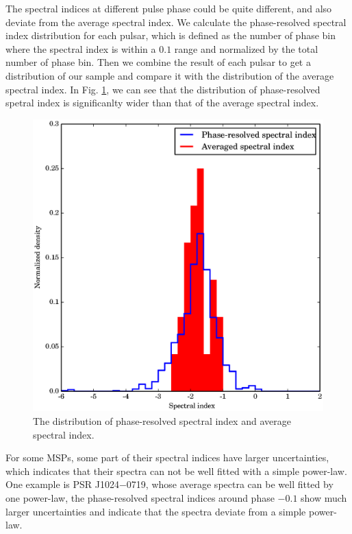 \documentclass[useAMS,usenatbib]{mn2e}
\begin{document}
The spectral indices at different pulse phase could be quite different, 
and also deviate from the average spectral index.
%
We calculate the phase-resolved spectral index distribution for each pulsar, 
which is defined as the number of phase bin where the spectral index is 
within a $0.1$ range and normalized by the total number of phase bin. 
%
Then we combine the result of each pulsar to get a distribution of 
our sample and compare it with the distribution of the average spectral 
index.
%
In Fig. \ref{phaseRev}, we can see that the distribution of phase-resolved 
spetral index is significanlty wider than that of the average spectral 
index.

\begin{figure}
\begin{center}
\includegraphics[width=3.5 in]{phaseRevHist.ps}
\caption{The distribution of phase-resolved spectral index and 
average spectral index.} 
\label{phaseRev}
\end{center}
\end{figure}

For some MSPs, some part of their spectral indices have larger uncertainties, 
which indicates that their spectra can not be well fitted with a simple power-law. 
%
One example is PSR J1024$-$0719, whose average spectra can be well fitted by 
one power-law, the phase-resolved spectral indices around phase $-0.1$ show 
much larger uncertainties and indicate that the spectra deviate from a 
simple power-law.
\end{document}
